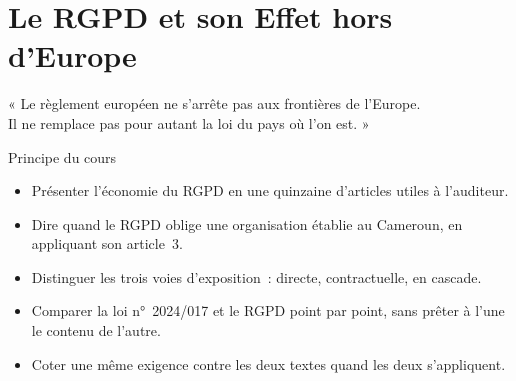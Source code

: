
\chapter{Le RGPD et son Effet hors d'Europe}
\label{chap:rgpd}

\epigraph{%
    « Le règlement européen ne s'arrête pas aux frontières de l'Europe.\\
    Il ne remplace pas pour autant la loi du pays où l'on est. »%
}{Principe du cours}


\begin{boxobjectifs}
\begin{itemize}
    \item Présenter l'économie du RGPD en une quinzaine d'articles utiles à
          l'auditeur.
    \item Dire quand le RGPD oblige une organisation établie au Cameroun, en
          appliquant son article~3.
    \item Distinguer les trois voies d'exposition~: directe, contractuelle,
          en cascade.
    \item Comparer la loi n°~2024/017 et le RGPD point par point, sans
          prêter à l'une le contenu de l'autre.
    \item Coter une même exigence contre les deux textes quand les deux
          s'appliquent.
\end{itemize}
\end{boxobjectifs}

\bigskip

